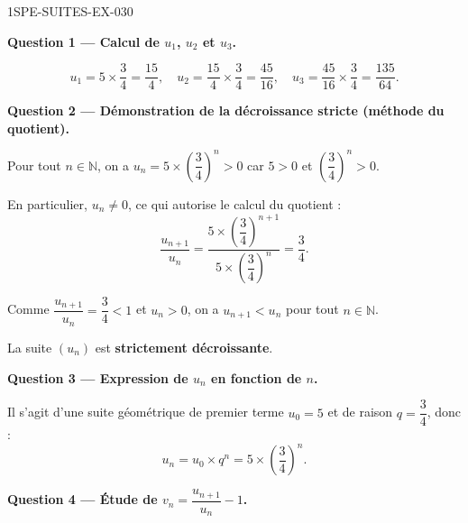 \begin{corrige}{1SPE-SUITES-EX-030}

\textbf{Question 1 — Calcul de $u_1$, $u_2$ et $u_3$.}

\[
  u_1 = 5 \times \frac{3}{4} = \frac{15}{4}, \quad u_2 = \frac{15}{4} \times \frac{3}{4} = \frac{45}{16}, \quad u_3 = \frac{45}{16} \times \frac{3}{4} = \frac{135}{64}.
\]

\medskip
\textbf{Question 2 — Démonstration de la décroissance stricte (méthode du quotient).}

Pour tout $n \in \mathbb{N}$, on a $u_n = 5 \times \left(\dfrac{3}{4}\right)^n > 0$ car $5 > 0$ et $\left(\dfrac{3}{4}\right)^n > 0$.

En particulier, $u_n \neq 0$, ce qui autorise le calcul du quotient :
\[
  \frac{u_{n+1}}{u_n} = \frac{5 \times \left(\dfrac{3}{4}\right)^{n+1}}{5 \times \left(\dfrac{3}{4}\right)^n} = \frac{3}{4}.
\]


Comme $\dfrac{u_{n+1}}{u_n} = \dfrac{3}{4} < 1$ et $u_n > 0$, on a $u_{n+1} < u_n$ pour tout $n \in \mathbb{N}$.

La suite $(u_n)$ est \textbf{strictement décroissante}.

\medskip
\textbf{Question 3 — Expression de $u_n$ en fonction de $n$.}

Il s'agit d'une suite géométrique de premier terme $u_0 = 5$ et de raison $q = \dfrac{3}{4}$, donc :
\[
  u_n = u_0 \times q^n = 5 \times \left(\frac{3}{4}\right)^n.
\]

\medskip
\textbf{Question 4 — Étude de $v_n = \dfrac{u_{n+1}}{u_n} - 1$.}


\end{corrige}
